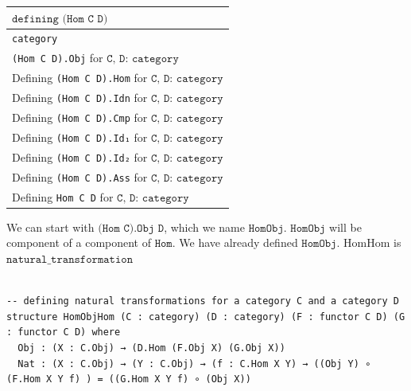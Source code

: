 \documentclass{book}
\newcounter{lcounter}
\begin{document}
{
\small
\begin{center}
\begin{tabular}{|l|} 
 \hline
 $\texttt{defining (Hom C D)}$\\
 \hline \hline
 \texttt{category} \\ 
 \hline
 \texttt{(Hom C D).Obj} for $\texttt{C, D: category}$\\
 \hline
 Defining  \texttt{(Hom C D).Hom} for $\texttt{C, D: category}$\\
 \hline
 Defining  \texttt{(Hom C D).Idn} for $\texttt{C, D: category}$\\
 \hline
 Defining  \texttt{(Hom C D).Cmp} for $\texttt{C, D: category}$\\
 \hline
 Defining  \texttt{(Hom C D).Id₁} for $\texttt{C, D: category}$\\
 \hline
 Defining \texttt{(Hom C D).Id₂} for $\texttt{C, D: category}$\\
 \hline
 Defining \texttt{(Hom C D).Ass} for $\texttt{C, D: category}$\\
 \hline
 Defining \texttt{Hom C D} for $\texttt{C, D: category}$\\
 \hline
\end{tabular}
\end{center}
}


We can start with $\texttt{(Hom C).Obj D}$, which we name $\texttt{HomObj}$. $\texttt{HomObj}$ will be component of a component of $\texttt{Hom}$. We have already defined $\texttt{HomObj}$. $\text{HomHom}$ is $\texttt{natural_transformation}$

\begin{center}
\begin{tcolorbox}[width=5in,colback={white},title={\begin{center}\texttt{Lean \thelcounter} \addtocounter{lcounter}{1}  \end{center}},colbacktitle=Blue,coltitle=black]
\begin{verbatim}

-- defining natural transformations for a category C and a category D
structure HomObjHom (C : category) (D : category) (F : functor C D) (G : functor C D) where
  Obj : (X : C.Obj) → (D.Hom (F.Obj X) (G.Obj X))
  Nat : (X : C.Obj) → (Y : C.Obj) → (f : C.Hom X Y) → ((Obj Y) ∘ (F.Hom X Y f) ) = ((G.Hom X Y f) ∘ (Obj X))

\end{verbatim}%
\end{tcolorbox}
\end{center}
\end{document}
